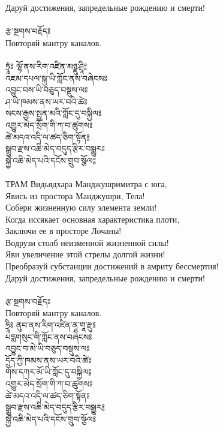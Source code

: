 Даруй достижения, запредельные рождению и смерти!\\
\\
{\ti རྩ་སྔགས་བརྗོདཿ }\\
Повторяй мантру каналов.\\
\\
{\ti ཏྲཱཾཿ ལྷོ་ནས་རིག་འཛིན་མཉྫུ་ཤྲཱི༔ \\
འཇམ་དཔལ་སྐུ་ཡི་ཀློང་ནས་བཞེངསཿ \\
འབྱུང་བས་ཡི་བཅུད་བསྡུས་ལཿ \\
ཤ་ཡི་ཁམས་ནས་ཡར་བའི་ཚེཿ \\
སངས་རྒྱས་སྤྱན་མའི་ཀློང་དུ་བསྐྱིལཿ \\
འགྱུར་མེད་སྲོག་གི་ཀ་བ་ཚུགསཿ \\
ཚེ་མདའ་འདི་ལ་ཚད་ཅིག་སྟོན༔ \\
སྒྲུབ་རྫས་འཆི་མེད་བདུད་རྩིར་བསྒྱུརཿ\\ 
སྐྱེ་འཆི་མེད་པའི་དངོས་གྲུབ་སྩོལ༔ \\}
\\
ТРАМ   Видьядхара Манджушримитра с юга,\\
Явись из простора Манджушри, Тела!\\
Собери жизненную силу элемента земли!\\
Когда иссякает основная характеристика плоти,\\
Заключи ее в просторе Лочаны!\\
Водрузи столб неизменной жизненной силы!\\
Яви увеличение этой стрелы долгой жизни!\\
Преобразуй субстанции достижений в амриту бессмертия!\\
Даруй достижения, запредельные рождению и смерти!\\
\\
{\ti རྩ་སྔགས་བརྗོདཿ }\\
Повторяй мантру каналов.
\\
{\ti ཧྲཱིཿ ནུབ་ནས་རིག་འཛིན་ནཱ་གཱ་རྫུཿ \\
པདྨགསུང་གི་ཀློང་ནས་བཞེངསཿ \\
འབྱུང་བ་མེ་ཡི་བཅུད་བསྡུས་ལཿ \\
དྲོད་ཀྱི་ཁམས་ནས་ཡར་བའི་ཚེཿ \\
གོས་དཀར་མོ་ཡི་ཀློང་དུ་བསྐྱིལ༔ \\
འགྱུར་མེད་སྲོག་གི་ཀ་བ་ཚུགསཿ \\
ཚེ་མདའ་འདི་ལ་ཚད་ཅིག་སྟོནཿ \\
སྒྲུབ་རྫས་འཆི་མེད་བདུད་རྩིར་བསྒྱུར༔ \\
སྐྱེ་འཆི་མེད་པའི་དངོས་གྲུབ་སྩོལཿ }\\
